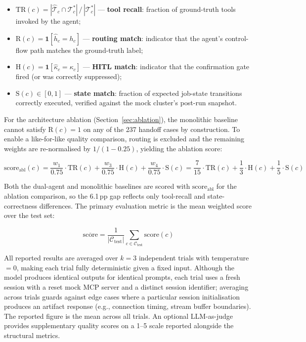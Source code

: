 \begin{itemize}
    \item $\text{TR}(c) = |\hat{\mathcal{T}}_c \cap \mathcal{T}_c^*| \,/\, |\mathcal{T}_c^*|$ — \textbf{tool recall}: fraction of ground-truth tools invoked by the agent;
    \item $\text{R}(c) = \mathbf{1}[\hat{h}_c = h_c]$ — \textbf{routing match}: indicator that the agent's control-flow path matches the ground-truth label;
    \item $\text{H}(c) = \mathbf{1}[\hat{\kappa}_c = \kappa_c]$ — \textbf{HITL match}: indicator that the confirmation gate fired (or was correctly suppressed);
    \item $\text{S}(c) \in [0,1]$ — \textbf{state match}: fraction of expected job-state transitions correctly executed, verified against the mock cluster's post-run snapshot.
\end{itemize}
For the architecture ablation (Section~\ref{sec:ablation}), the monolithic baseline cannot satisfy $\text{R}(c)=1$ on any of the 237 handoff cases by construction. To enable a like-for-like quality comparison, routing is excluded and the remaining weights are re-normalised by $1/(1-0.25)$, yielding the ablation score:

\begin{equation}
    \text{score}_{\text{abl}}(c) = \frac{w_1}{0.75}\cdot\text{TR}(c) + \frac{w_3}{0.75}\cdot\text{H}(c) + \frac{w_4}{0.75}\cdot\text{S}(c)
    = \frac{7}{15}\cdot\text{TR}(c) + \frac{1}{3}\cdot\text{H}(c) + \frac{1}{5}\cdot\text{S}(c)
    \label{eq:scoring-abl}
\end{equation}

Both the dual-agent and monolithic baselines are scored with $\text{score}_{\text{abl}}$ for the ablation comparison, so the 6.1\,pp gap reflects only tool-recall and state-correctness differences.
The primary evaluation metric is the mean weighted score over the test set:

\begin{equation}
    \overline{\text{score}} = \frac{1}{|\mathcal{C}_{\text{test}}|} \sum_{c \in \mathcal{C}_{\text{test}}} \text{score}(c)
    \label{eq:mean-score}
\end{equation}

All reported results are averaged over $k=3$ independent trials with temperature $= 0$, making each trial fully deterministic given a fixed input. Although the model produces identical outputs for identical prompts, each trial uses a fresh session with a reset mock MCP server and a distinct session identifier; averaging across trials guards against edge cases where a particular session initialisation produces an artifact response (e.g., connection timing, stream buffer boundaries). The reported figure is the mean across all trials. An optional LLM-as-judge provides supplementary quality scores on a 1--5 scale reported alongside the structural metrics.
